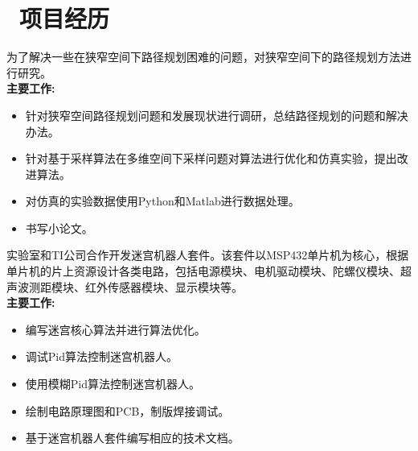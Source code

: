 \documentclass{resume}
\begin{document}
\section{\faUsers\ 项目经历}


\begin{onehalfspacing}
  为了解决一些在狭窄空间下路径规划困难的问题，对狭窄空间下的路径规划方法进行研究。\\
  \textbf {主要工作:}
  \begin{itemize}

    \item 针对狭窄空间路径规划问题和发展现状进行调研，总结路径规划的问题和解决办法。
    \item 针对基于采样算法在多维空间下采样问题对算法进行优化和仿真实验，提出改进算法。%
    \item 对仿真的实验数据使用Python和Matlab进行数据处理。
    \item 书写小论文。
  \end{itemize}

\end{onehalfspacing}

\begin{onehalfspacing}
  实验室和TI公司合作开发迷宫机器人套件。该套件以MSP432单片机为核心，根据单片机的片上资源设计各类电路，包括电源模块、电机驱动模块、陀螺仪模块、超声波测距模块、红外传感器模块、显示模块等。\\  
  \textbf {主要工作:}
  \begin{itemize}

    \item 编写迷宫核心算法并进行算法优化。
    \item 调试Pid算法控制迷宫机器人。
     \item 使用模糊Pid算法控制迷宫机器人。
    \item 绘制电路原理图和PCB，制版焊接调试。
    \item 基于迷宫机器人套件编写相应的技术文档。
  \end{itemize}
\end{onehalfspacing}
\end{document}
